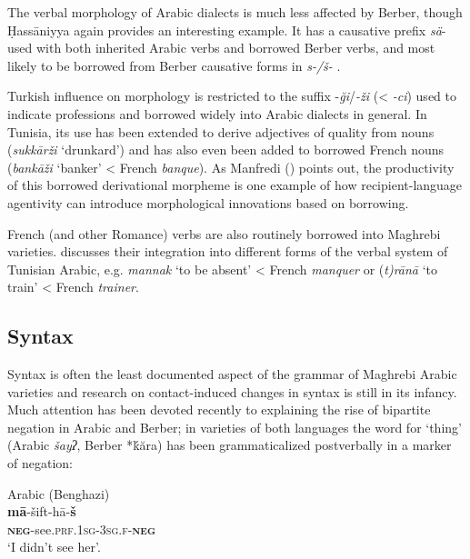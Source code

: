 \documentclass[output=paper]{langsci/langscibook}
\begin{document}
  The verbal morphology of Arabic dialects is much less affected by Berber, though Ḥassāniyya again provides an interesting example. It has a causative prefix \textit{sä}- used with both inherited Arabic verbs and borrowed Berber verbs, and most likely to be borrowed from Berber causative forms in \textit{s-/š-} \citep{Taine-Cheikh2008}. 

  Turkish influence on morphology is restricted to the suffix -\textit{ği}/\textit{{}-ži} (< \textit{{}-ci}) used to indicate professions and borrowed widely into Arabic dialects in general. In Tunisia, its use has been extended to derive adjectives of quality from nouns (\textit{sukkārži} ‘drunkard’) and has also even been added to borrowed French nouns (\textit{bankāži} ‘banker’ < French \textit{banque}). As Manfredi (\citeyear[410]{Manfredi2018}) points out, the productivity of this borrowed derivational morpheme is one example of how recipient-language agentivity can introduce morphological innovations based on borrowing.

  French (and other Romance) verbs are also routinely borrowed into Maghrebi varieties. \citet{Talmoudi1986} discusses their integration into different forms of the verbal system of Tunisian Arabic, e.g. \textit{mannak} `to be absent' < French \textit{manquer} or (\textit{t)rānā} `to train' < French \textit{trainer}.

\subsection{ Syntax}

Syntax is often the least documented aspect of the grammar of Maghrebi Arabic varieties and research on contact-induced changes in syntax is still in its infancy. Much attention has been devoted recently to explaining the rise of bipartite negation in Arabic and Berber; in varieties of both languages the word for ‘thing’ (Arabic \textit{šayʔ}, Berber *ḱăra) has been grammaticalized postverbally in a marker of negation:


\ea\label{ex:key:}


Arabic (Benghazi)\\
\gll \textbf{mā}-šift-hā-\textbf{š}\\
     \textbf{\textsc{neg}}-see.\textsc{prf}.\textsc{1sg}-\textsc{3sg.f}-\textbf{\textsc{neg}}\\
\glt `I didn’t see her'.
\z

\ea\label{ex:key:}
\end{document}
